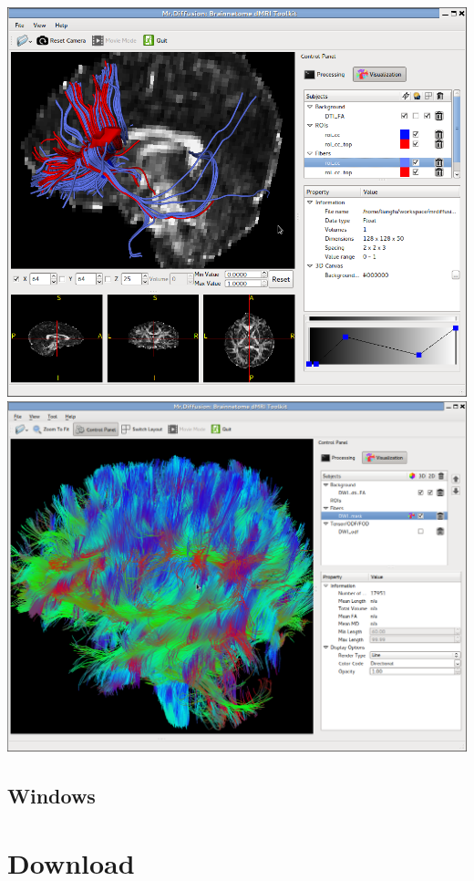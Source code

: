 \documentclass[letterpaper,10pt,english]{sphinxmanual}
\begin{document}
\includegraphics{fibers.png} \includegraphics{fibers2.png}


\subsection{Windows}
\label{screenshot:windows}

\section{Download}
\label{download:download}\label{download::doc}
\end{document}
